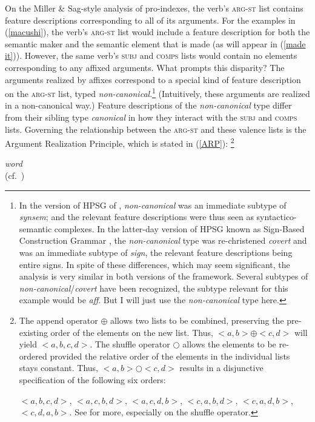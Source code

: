 \documentclass[output=paper
	        ,collection
	        ,collectionchapter
 	        ,biblatex
                ,babelshorthands
                ,newtxmath
                ,draftmode
                ,colorlinks, citecolor=brown
]{langscibook}
\begin{document}
On the Miller \& Sag-style analysis of pro-indexes, the verb's \textsc{arg-st} list contains feature descriptions corresponding to all of its arguments. For the examples in (\ref{macushi}), the verb's \textsc{arg-st} list would include a feature description for both the semantic maker and the semantic element that is made (as will appear in (\ref{made it})). However, the same verb's \textsc{subj} and \textsc{comps} lists would contain no elements corresponding to any affixed arguments. What prompts this disparity? The arguments realized by affixes correspond to a special kind of feature description on the \textsc{arg-st} list, typed \textit{non-canonical}.\footnote{In the version of HPSG of \cite{GSag2000a-u}, \textit{non-canonical} was an immediate subtype of \textit{synsem}; and the relevant feature descriptions were thus seen as syntactico-semantic complexes. In the latter-day version of HPSG known as Sign-Based Construction Grammar \citep{Sag2012a}, the \textit{non-canonical} type was re-christened \textit{covert} and was an immediate subtype of \textit{sign}, the relevant feature descriptions being entire signs. In spite of these differences, which may seem significant, the analysis is very similar in both versions of the framework. Several subtypes of \textit{non-canonical}/\textit{covert} have been recognized, the subtype relevant for this example would be \textit{aff}. But I will just use the \textit{non-canonical} type here.} (Intuitively, these arguments are realized in a non-canonical way.) Feature descriptions of the \textit{non-canonical} type differ from their sibling type \textit{canonical} in how they interact with the \textsc{subj} and \textsc{comps} lists. Governing the relationship between the \textsc{arg-st} and these valence lists is the Argument Realization Principle, which is stated in (\ref{ARP}):%
	\footnote{The append operator $\oplus$ allows two lists to be combined, preserving the pre-existing order of the elements on the new list. Thus, $<a, b> \oplus <c, d >$ will yield $<a, b, c, d>$. The shuffle operator $\bigcirc$ allows the elements to be re-ordered provided the relative order of the elements in the individual lists stays constant. Thus, $<a,b> \bigcirc <c, d>$ results in a disjunctive specification of the following six orders:
	
	$< a, b, c, d >$, $< a, c, b, d >$, $< a, c, d, b >$, $< c, a, b, d >$, $< c, a, d, b >$, $< c, d, a, b >$. See \cite{Reape94a} for more, especially on the shuffle operator.} 
%
\begin{exe}
\ex\label{ARP} 
\emph{word} \impl
\avmtmp{
	[ss|loc|cat &	[subj & \tag{B} \\
					comps & \tag{C}] \\
	arg-st \tag{A} & list!(canonical)! \upshape (= \tag{B} \+ \tag{C}) \relax $\bigcirc$ \tag{D} list!(non-canonical)! ] 
} \\
\hfill{(cf.\ \citealt[171]{GSag2000a-u})} \
\end{exe}
\end{document}
